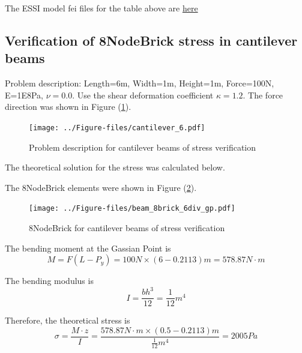 \documentclass[fleqn,11pt]{article}
\begin{document}
The ESSI model fei files for the table above are \href{https://github.com/yuan-energy/ESSI_Verification/blob/master/8NodeBrick/clamped_beam_cut/clamped_beam_cut.tar.gz?raw=true}{here}








\newpage
\subsection{Verification of 8NodeBrick stress in cantilever beams}





Problem description: Length=6m, Width=1m, Height=1m, Force=100N, E=1E8Pa, $\nu=0.0$. Use the shear deformation coefficient $\kappa=1.2$. The force direction was shown in Figure (\ref{fig Problem description for cantilever beams of stress verification}). 

\begin{figure}[H]
  \centering
  \texttt{[image: ../Figure-files/cantilever\_6.pdf]}
  \caption{Problem description for cantilever beams of stress verification}
  \label{fig Problem description for cantilever beams of stress verification}
\end{figure}

The theoretical solution for the stress was calculated below. 

The 8NodeBrick elements were shown in Figure (\ref{fig 8NodeBrick for cantilever beams of stress verification}).
\begin{figure}[H]
  \centering
  \texttt{[image: ../Figure-files/beam\_8brick\_6div\_gp.pdf]}
  \caption{8NodeBrick for cantilever beams of stress verification}
  \label{fig 8NodeBrick for cantilever beams of stress verification}
\end{figure}

The bending moment at the Gassian Point is 
\begin{equation}
  M=F(L-P_y)=100 N \times (6-0.2113) m = 578.87 N\cdot m
\end{equation}

The bending modulus is 
\begin{equation}
  I= \frac{bh^3}{12}=\frac{1}{12} m^4
\end{equation}

Therefore, the theoretical stress is 
\begin{equation}
  \sigma= \frac{M\cdot z}{I}= \frac{578.87 N\cdot m \times (0.5-0.2113) m }{\frac{1}{12} m^4}= 2005 Pa
\end{equation}
\end{document}
